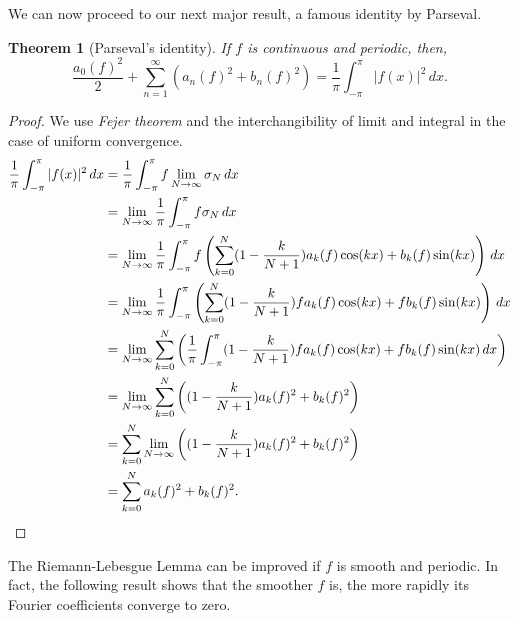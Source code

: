 \documentclass[12pt]{amsart}
\newtheorem{theorem}{Theorem}[section]
\theoremstyle{definition}
\begin{document}
We can now proceed to our next major result, a famous identity by Parseval.


\begin{theorem}[Parseval's identity]\footnotemark{}
    If $f$ is continuous and periodic, then,
        \begin{equation}
            \frac{a_0(f)^2}{2} + \sum_{n=1}^{\infty} \left(a_n(f)^2 + b_n(f)^2\right) = \frac{1}{\pi} \int_{-\pi}^{\pi} |f(x)|^2 \, dx.
        \end{equation}
\end{theorem}




\begin{proof}
    We use \textit{Fejer theorem} and the interchangibility of limit and integral in the case of uniform convergence.
    \[
    \begin{aligned}
        \frac{1}{\pi} \int_{-\pi}^{\pi} |f(x)|^2 \, dx
        &= \frac{1}{\pi} \int_{-\pi}^{\pi} f\lim_{N \to \infty}\sigma_N \, dx\\
        &= \lim_{N \to \infty}\frac{1}{\pi} \int_{-\pi}^{\pi} f\sigma_N \, dx\\
        &= \lim_{N \to \infty}\frac{1}{\pi} \int_{-\pi}^{\pi} f\left( \sum_{k=0}^{N} (1 - \frac{k}{N+1}) a_k(f)\cos(kx) + b_k(f)\sin(kx) \right)\, dx\\
        &= \lim_{N \to \infty}\frac{1}{\pi} \int_{-\pi}^{\pi} \left( \sum_{k=0}^{N} (1 - \frac{k}{N+1}) fa_k(f)\cos(kx) + fb_k(f)\sin(kx) \right)\, dx\\
        &= \lim_{N \to \infty}  \sum_{k=0}^{N} \left( \frac{1}{\pi} \int_{-\pi}^{\pi}(1 - \frac{k}{N+1}) fa_k(f)\cos(kx) + fb_k(f)\sin(kx)\, dx \right)\\
        &= \lim_{N \to \infty}  \sum_{k=0}^{N} \left((1 - \frac{k}{N+1}) a_k(f)^2 + b_k(f)^2 \right)\\
        &=   \sum_{k=0}^{N} \lim_{N \to \infty}\left((1 - \frac{k}{N+1}) a_k(f)^2 + b_k(f)^2 \right)\\\
        &=   \sum_{k=0}^{N}  a_k(f)^2 + b_k(f)^2. \qedhere
    \end{aligned}
    \]
\end{proof}


The Riemann-Lebesgue Lemma can be improved if $f$ is smooth and periodic. In
fact, the following result shows that the smoother $f$ is, the more rapidly its Fourier
coefficients converge to zero.
\end{document}
